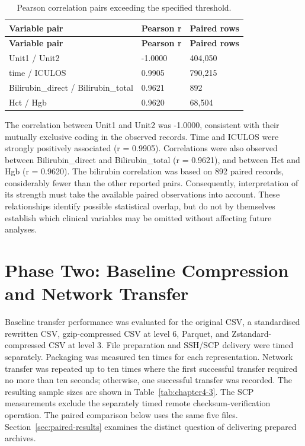 \begin{longtable}[]{@{}lll@{}}
	\caption{Pearson correlation pairs exceeding the specified threshold.}\label{tab:chapter4-2}\\
	\toprule\noalign{}
	\textbf{Variable pair} & \textbf{Pearson r} & \textbf{Paired rows} \\
	\midrule\noalign{}
	\endfirsthead
	\toprule\noalign{}
	\textbf{Variable pair} & \textbf{Pearson r} & \textbf{Paired rows} \\
	\midrule\noalign{}
	\endhead
	\bottomrule\noalign{}
	\endlastfoot
	Unit1 / Unit2 & -1.0000 & 404,050 \\
	time / ICULOS & 0.9905 & 790,215 \\
	Bilirubin\_direct / Bilirubin\_total & 0.9621 & 892 \\
	Hct / Hgb & 0.9620 & 68,504 \\
\end{longtable}

The correlation between Unit1 and Unit2 was -1.0000, consistent with
their mutually exclusive coding in the observed records. Time and ICULOS
were strongly positively associated (r = 0.9905). Correlations were also
observed between Bilirubin\_direct and Bilirubin\_total (r = 0.9621),
and between Hct and Hgb (r = 0.9620). The bilirubin correlation was
based on 892 paired records, considerably fewer than the other reported
pairs. Consequently, interpretation of its strength must take the
available paired observations into account. These relationships identify
possible statistical overlap, but do not by themselves establish which
clinical variables may be omitted without affecting future analyses.

\section{Phase Two: Baseline Compression and Network
	Transfer}\label{phase-two-baseline-compression-and-network-transfer}

Baseline transfer performance was evaluated for the original CSV, a
standardised rewritten CSV, gzip-compressed CSV at level 6, Parquet, and
Zstandard-compressed CSV at level 3. File preparation and SSH/SCP
delivery were timed separately. Packaging was measured ten times for
each representation. Network transfer was repeated up to ten times where
the first successful transfer required no more than ten seconds;
otherwise, one successful transfer was recorded. The resulting sample
sizes are shown in Table~\ref{tab:chapter4-3}. The SCP measurements exclude the
separately timed remote checksum-verification operation. The paired comparison below uses the same five files. Section~\ref{sec:paired-results} examines the distinct question of delivering prepared archives.

